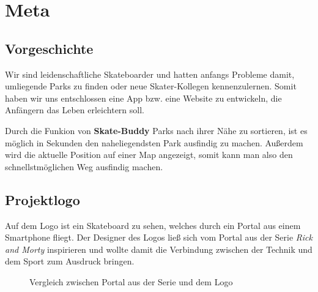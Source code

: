 \chapter{Meta}

\section{Vorgeschichte}

Wir sind leidenschaftliche Skateboarder und hatten anfangs Probleme damit, umliegende Parks
zu finden oder neue Skater-Kollegen kennenzulernen. Somit haben wir uns entschlossen eine
App bzw. eine Website zu entwickeln, die Anfängern das Leben erleichtern soll.

Durch die Funkion von \textbf{Skate-Buddy} Parks nach ihrer Nähe zu sortieren, ist es möglich
in Sekunden den naheliegendsten Park ausfindig zu machen. Außerdem wird die aktuelle Position
auf einer Map angezeigt, somit kann man also den schnellstmöglichen Weg ausfindig machen.

\section{Projektlogo}
\label{logo}

Auf dem Logo ist ein Skateboard zu sehen, welches durch ein Portal aus einem Smartphone fliegt.
Der Designer des Logos ließ sich vom Portal aus der Serie \textit{Rick and Morty} inspirieren und wollte damit die Verbindung zwischen
der Technik und dem Sport zum Ausdruck bringen.



\begin{figure}[H]
    \centering
    \hfill
    \hfill
    \hfill
    \caption{Vergleich zwischen Portal aus der Serie und dem Logo}
\end{figure}